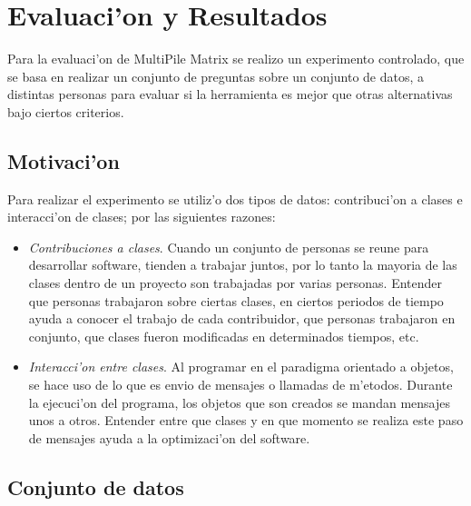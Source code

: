 \chapter{Evaluaci'on y Resultados}
\label{capitulocinco}
Para la evaluaci'on de MultiPile Matrix se realizo un experimento controlado, que se basa en realizar un conjunto de preguntas sobre un conjunto de datos, a distintas personas para evaluar si la herramienta es mejor que otras alternativas bajo ciertos criterios.

\section{Motivaci'on}

Para realizar el experimento se utiliz'o dos tipos de datos: contribuci'on a clases e interacci'on de clases; por las siguientes razones:

\begin{itemize}
\item \emph{Contribuciones a clases}. Cuando un conjunto de personas se reune para desarrollar software, tienden a trabajar juntos, por lo tanto la mayoria de las clases dentro de un proyecto son trabajadas por varias personas. Entender que personas trabajaron sobre ciertas clases, en ciertos periodos de tiempo ayuda a conocer el trabajo de cada contribuidor, que personas trabajaron en conjunto, que clases fueron modificadas en determinados tiempos, etc.\cite{Fritz}
\item \emph{Interacci'on entre clases}. Al programar en el paradigma orientado a objetos, se hace uso de lo que es envio de mensajes o llamadas de m'etodos. Durante la ejecuci'on del programa, los objetos que son creados se mandan mensajes unos a otros. Entender entre que clases y en que momento se realiza este paso de mensajes ayuda a la optimizaci'on del software.\cite{Sillito}
\end{itemize}

\section{Conjunto de datos}

